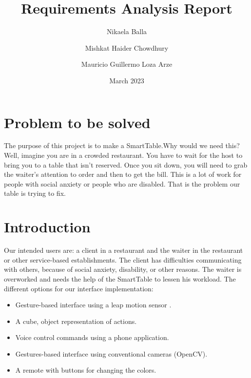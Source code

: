 \documentclass{article}
\title{Requirements Analysis Report}
\author{Nikaela Balla
\and Mishkat Haider Chowdhury
\and Mauricio Guillermo Loza Arze}
\date{March 2023}
\begin{document}
\maketitle

\section{ Problem to be solved}
\label{sec:problem}
The purpose of this project is to make a SmartTable.Why would we need this? 
Well, imagine you are in a crowded restaurant. You have to wait for the host to bring you to a table that isn't reserved. Once you sit down,
you will need to grab the waiter's attention to order and then to get the bill. This is a lot of work for people with social anxiety or people 
who are disabled. That is the problem our table is trying to fix. 
\section{ Introduction}
Our intended users are: a client in a restaurant and the waiter in the restaurant or other service-based establishments.
The client has difficulties communicating with others, because of social anxiety, disability, or other reasons. The waiter is overworked and
needs the help of the SmartTable to lessen his workload.
The different options for our interface implementation: \begin{itemize}
    \item Gesture-based interface using a leap motion sensor \cite{zaicti2015free}.
    \item A cube, object representation of actions.
    \item  Voice control commands using a phone application.
    \item  Gestures-based interface using conventional cameras (OpenCV).
    \item A remote with buttons for changing the colors.
\end{itemize}
\end{document}
